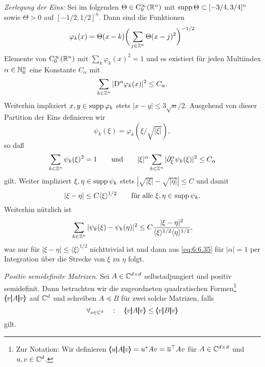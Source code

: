 \medskip\noindent
{\em Zerlegung der Eins:} Sei im folgenden $\Theta\in\mathrm C_0^\infty(\mathbb R^n)$ mit $\operatorname{supp}\Theta\subset [-3/4,3/4]^n$ sowie $\Theta>0$ auf $[-1/2,1/2]^n$. Dann sind die Funktionen
\begin{equation}
\varphi_k(x) = \Theta(x-k) \bigg(\sum_{j\in\mathbb Z^n} \Theta(x-j)^2\bigg)^{-1/2}
\end{equation}
Elemente von $\mathrm C_0^\infty(\mathbb R^n)$ mit $\sum_{k} \varphi_k(x)^2=1$ und es existiert für jeden Multiindex $\alpha\in\mathbb N_0^n$ eine Konstante $C_\alpha$ mit
\begin{equation}
    \sum_{k\in\mathbb Z^n} | \mathrm D^\alpha \varphi_k(x)|^2 \le C_\alpha.
\end{equation}
Weiterhin impliziert $x,y\in\operatorname{supp}\varphi_k$ stets $|x-y|\le 3\sqrt n/2$. Ausgehend von dieser Partition der Eins definieren wir
\begin{equation}
    \psi_k(\xi)= \varphi_k(\xi / \sqrt{|\xi|}), 
\end{equation}
so daß
\begin{equation}\label{eq:6:6.35} 
    \sum_{k\in\mathbb Z^n} \psi_k(\xi)^2 = 1\qquad\text{und}\qquad |\xi|^\alpha \sum_{k\in\mathbb Z^n} |\partial_\xi^\alpha \psi_k(\xi)|^2 \le C_\alpha
\end{equation}
gilt. Weiter impliziert $\xi,\eta\in\operatorname{supp}\psi_k$ stets $|\sqrt{|\xi|}-\sqrt{|\eta|}|\le C$ und damit 
\begin{equation}\label{eq:6:6.36}
 |\xi-\eta|\le C \langle\xi\rangle^{1/2} \qquad\text{für alle $\xi,\eta\in\operatorname{supp}\psi_k$}.
\end{equation}
Weiterhin nützlich ist
\begin{equation}\label{eq:6:6.37}
  \sum_{k\in\mathbb Z^n} |\psi_k(\xi)-\psi_k(\eta)|^2 \le C \frac{|\xi-\eta|^2}{ \langle\xi\rangle^{1/2} \langle\eta\rangle^{1/2}},
\end{equation} 
was nur für $|\xi-\eta|\le \langle\xi\rangle^{1/2}$ nichttrivial ist und dann aus \eqref{eq:6:6.35} für $|\alpha|=1$ per Integration über die Strecke von $\xi$ zu $\eta$ folgt.

\medskip\noindent
{\em Positiv semidefinite Matrizen.}
Sei $A\in\mathbb C^{d\times d}$ selbstadjungiert und positiv semidefinit. Dann betrachten wir die zugeordneten quadratischen Formen\footnote{Zur Notation: Wir definieren $\pmb\langle u\pmb|A\pmb|v\pmb\rangle = u^* A v=\overline u^\top A v$ für $A\in\mathbb C^{d\times d}$ und $u,v\in\mathbb C^{d}$.} $\pmb\langle v\pmb|A\pmb|v\pmb\rangle$ auf $\mathbb C^d$ und  schreiben $A \preceq B$ für zwei solche Matrizen, falls 
\begin{equation}
   \forall_{v\in\mathbb C^d} \quad:\quad \pmb\langle v\pmb|A\pmb|v\pmb\rangle\le \pmb\langle v\pmb|B\pmb|v\pmb\rangle
\end{equation}
gilt. 

